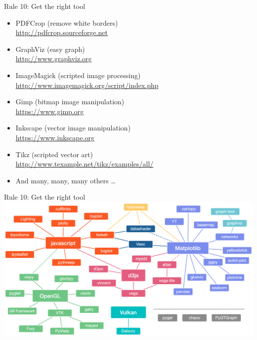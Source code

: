 \documentclass[10pt,aspectratio=169]{beamer}
\begin{document}
\begin{frame}{Rule 10: Get the right tool}
  \begin{itemize}
  \item PDFCrop (remove white borders)\\
    \url{http://pdfcrop.sourceforge.net}
  \item GraphViz (easy graph)\\
    \url{http://www.graphviz.org}
  \item ImageMagick (scripted image processing)\\
    \url{http://www.imagemagick.org/script/index.php}
  \item Gimp (bitmap image manipulation)\\
    \url{https://www.gimp.org}
  \item Inkscape (vector image manipulation)\\
    \url{https://www.inkscape.org}
  \item Tikz (scripted vector art)\\
    \url{http://www.texample.net/tikz/examples/all/}
  \item And many, many, many others …
  \end{itemize}
\end{frame}

\begin{frame}{Rule 10: Get the right tool}
    \includegraphics[width=\textwidth]{rule-10bis.png}
\end{frame}


  
\end{document}
